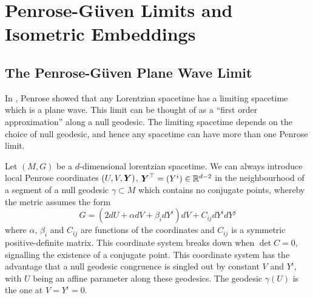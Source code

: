 \chapter{Penrose-G\"uven Limits and Isometric Embeddings}
\label{pglimits}
\section{The Penrose-G\"{u}ven Plane Wave Limit}
In \cite{Penrose1}, Penrose showed that any Lorentzian spacetime has a limiting
spacetime which is a plane wave. This limit can be thought of as a ``first order
approximation'' along a null geodesic. The limiting spacetime depends on the
choice of null geodesic, and hence any spacetime can have more than one Penrose
limit.

Let $(M,G)$ be a $d$-dimensional lorentzian spacetime. We can always introduce
local Penrose coordinates $(U,V,{\boldsymbol {Y} })$, ${\boldsymbol {Y} }^\top=(Y^i)\in{\mathbb R}^{d-2}$ in the
neighbourhood of a segment of a null geodesic $\gamma\subset M$ which contains
no conjugate points, whereby the metric assumes the form \cite{LP1}
\begin{equation}
  \label{GPenrose}
  G = \left(2dU + \alpha dV + \beta_i dY^i \right)dV + C_{ij} dY^i dY^j
\end{equation}
where $\alpha$, $\beta_i$ and $C_{ij}$ are functions of the coordinates and
$C_{ij}$ is a symmetric positive-definite matrix. This coordinate system breaks
down when $\det C=0$, signalling the existence of a conjugate point. This
coordinate system has the advantage that a null geodesic congruence is singled
out by constant $V$ and $Y^i$, with $U$ being an affine parameter along
these geodesics. The geodesic $\gamma(U)$ is the one at $V=Y^i=0$.
 
